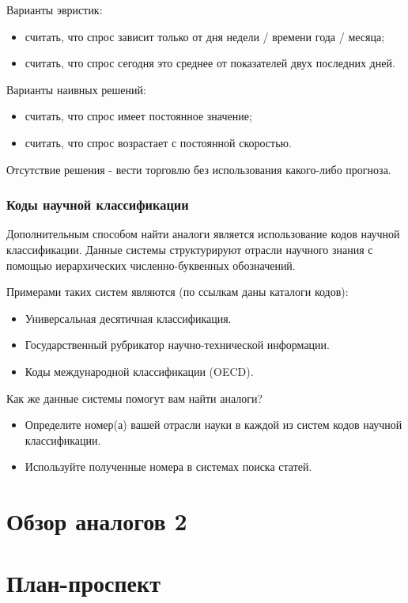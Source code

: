 \documentclass{report}
\begin{document}
Варианты эвристик:

\begin{itemize}
	\item считать, что спрос зависит только от дня недели / времени года / месяца;
	\item считать, что спрос сегодня это среднее от показателей двух последних дней.
\end{itemize}

Варианты наивных решений:

\begin{itemize}
	\item считать, что спрос имеет постоянное значение;
	\item считать, что спрос возрастает с постоянной скоростью.
\end{itemize}
Отсутствие решения - вести торговлю без использования какого-либо прогноза.

\subsubsection{Коды научной классификации}
Дополнительным способом найти аналоги является использование кодов научной классификации. Данные системы структурируют отрасли научного знания с помощью иерархических численно-буквенных обозначений.

Примерами таких систем являются (по ссылкам даны каталоги кодов):
\begin{itemize}
	\item Универсальная десятичная классификация.
	\item Государственный рубрикатор научно-технической информации.
	\item Коды международной классификации (OECD).
\end{itemize}
Как же данные системы помогут вам найти аналоги?

\begin{itemize}
	\item Определите номер(а) вашей отрасли науки в каждой из систем кодов научной классификации.
	\item Используйте полученные номера в системах поиска статей.
\end{itemize}





\section{Обзор аналогов 2}
\section{План-проспект}
\end{document}
